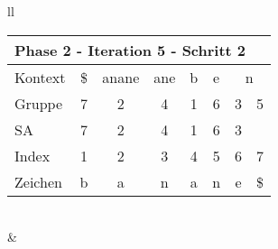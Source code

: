 \begin{table}[H]
\begin{adjustbox}{max width=\textwidth}
\begin{tabular}{ll}
\begin{tabular}{lccccccc}
\multicolumn{8}{l}{Phase 2 - Iteration 5 - Schritt 2}                                                                                                                                                                     \\ \hline
\multicolumn{1}{l|}{Kontext} & \multicolumn{1}{c|}{\$} & \multicolumn{1}{c|}{anane} & \multicolumn{1}{c|}{ane} & \multicolumn{1}{c|}{b} & \multicolumn{1}{c|}{\cellcolor[HTML]{\green}e} & \multicolumn{2}{c}{n}         \\
\multicolumn{1}{l|}{Gruppe}  & \multicolumn{1}{c|}{7}  & \multicolumn{1}{c|}{2}     & \multicolumn{1}{c|}{4}   & \multicolumn{1}{c|}{1} & \multicolumn{1}{c|}{\cellcolor[HTML]{\green}6} & 3                         & 5  \\ 
\multicolumn{1}{l|}{SA}      & \multicolumn{1}{c|}{7}  & \multicolumn{1}{c|}{2}     & \multicolumn{1}{c|}{4}   & \multicolumn{1}{c|}{1} & \multicolumn{1}{c|}{\cellcolor[HTML]{\green}6} & 3                         &    \\ \hline
\multicolumn{1}{l|}{Index}   & 1                       & 2                          & 3                        & 4                      & 5                                              & \cellcolor[HTML]{\green}6 & 7  \\
\multicolumn{1}{l|}{Zeichen} & b                       & a                          & n                        & a                      & n                                              & \cellcolor[HTML]{\green}e & \$
\end{tabular}

\\
&
\\


\end{tabular}
\end{adjustbox}
\end{table}
